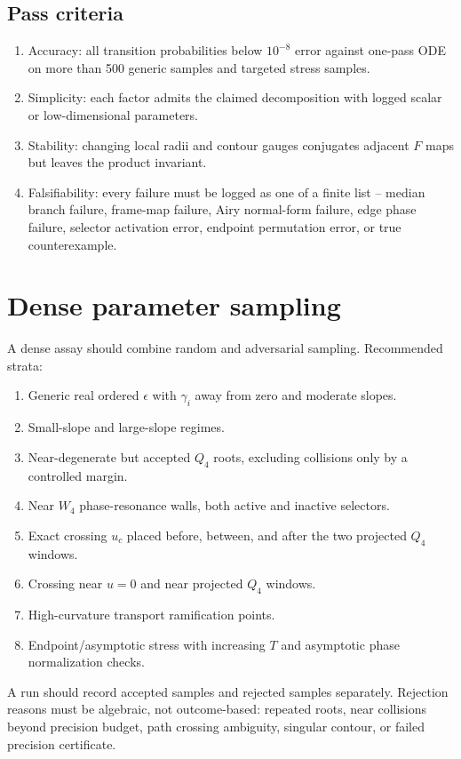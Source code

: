 \documentclass[11pt]{article}
\begin{document}
\subsection{Pass criteria}

\begin{enumerate}
  \item Accuracy: all transition probabilities below $10^{-8}$ error against one-pass ODE on more than 500 generic samples and targeted stress samples.
  \item Simplicity: each factor admits the claimed decomposition with logged scalar or low-dimensional parameters.
  \item Stability: changing local radii and contour gauges conjugates adjacent $F$ maps but leaves the product invariant.
  \item Falsifiability: every failure must be logged as one of a finite list -- median branch failure, frame-map failure, Airy normal-form failure, edge phase failure, selector activation error, endpoint permutation error, or true counterexample.
\end{enumerate}

\section{Dense parameter sampling}

A dense assay should combine random and adversarial sampling. Recommended strata:
\begin{enumerate}
  \item Generic real ordered $\epsilon$ with $\gamma_i$ away from zero and moderate slopes.
  \item Small-slope and large-slope regimes.
  \item Near-degenerate but accepted $Q_4$ roots, excluding collisions only by a controlled margin.
  \item Near $W_4$ phase-resonance walls, both active and inactive selectors.
  \item Exact crossing $u_c$ placed before, between, and after the two projected $Q_4$ windows.
  \item Crossing near $u=0$ and near projected $Q_4$ windows.
  \item High-curvature transport ramification points.
  \item Endpoint/asymptotic stress with increasing $T$ and asymptotic phase normalization checks.
\end{enumerate}

A run should record accepted samples and rejected samples separately. Rejection reasons must be algebraic, not outcome-based: repeated roots, near collisions beyond precision budget, path crossing ambiguity, singular contour, or failed precision certificate.
\end{document}
